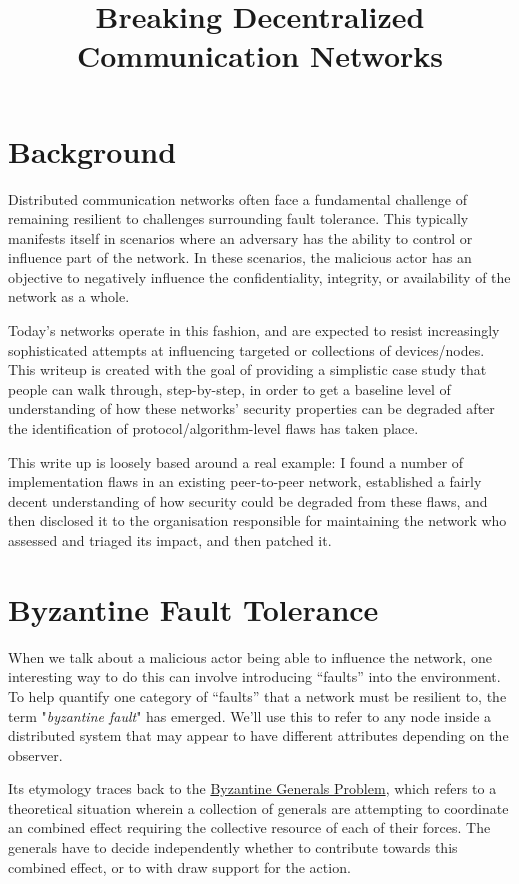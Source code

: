 \title{Breaking Decentralized Communication Networks}

\section{Background}

Distributed communication networks often face a fundamental challenge of remaining resilient to challenges surrounding fault tolerance. This typically manifests itself in scenarios where an adversary has the ability to control or influence part of the network. In these scenarios, the malicious actor has an objective to negatively influence the confidentiality, integrity, or availability of the network as a whole.

Today's networks operate in this fashion, and are expected to resist increasingly sophisticated attempts at influencing targeted or collections of devices/nodes. This writeup is created with the goal of providing a simplistic case study that people can walk through, step-by-step, in order to get a baseline level of understanding of how these networks’ security properties can be degraded after the identification of protocol/algorithm-level flaws has taken place.

This write up is loosely based around a real example: I found a number of implementation flaws in an existing peer-to-peer network, established a fairly decent understanding of how security could be degraded from these flaws, and then disclosed it to the organisation responsible for maintaining the network who assessed and triaged its impact, and then patched it.

\section{Byzantine Fault Tolerance}

When we talk about a malicious actor being able to influence the network, one interesting way to do this can involve introducing “faults” into the environment. To help quantify one category of “faults” that a network must be resilient to, the term "\emph{byzantine fault}" has emerged. We'll use this to refer to any node inside a distributed system that may appear to have different attributes depending on the observer.

        	Its etymology traces back to the \href{https://www.microsoft.com/en-us/research/wp-content/uploads/2016/12/The-Byzantine-Generals-Problem.pdf}{Byzantine Generals Problem}, which refers to a theoretical situation wherein a collection of generals are attempting to coordinate an combined effect requiring the collective resource of each of their forces. The generals have to decide independently whether to contribute towards this combined effect, or to with draw support for the action.

